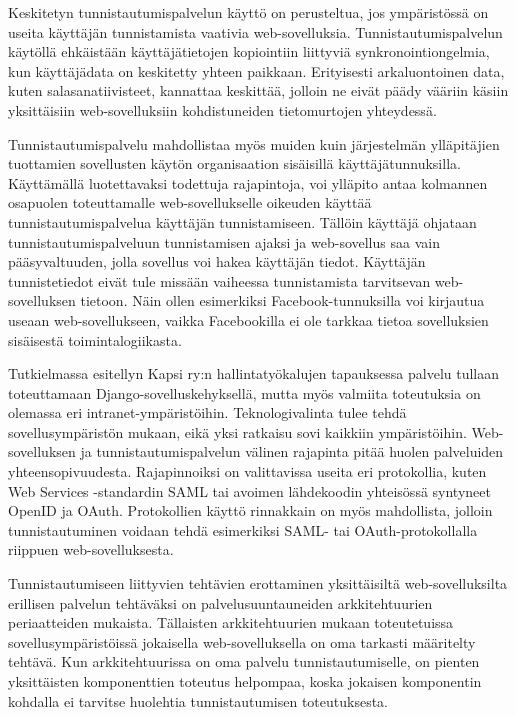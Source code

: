 Keskitetyn tunnistautumispalvelun käyttö on perusteltua, jos ympäristössä on useita käyttäjän tunnistamista vaativia web-sovelluksia. Tunnistautumispalvelun käytöllä ehkäistään käyttäjätietojen kopiointiin liittyviä synkronointiongelmia, kun käyttäjädata on keskitetty yhteen paikkaan. Erityisesti arkaluontoinen data, kuten salasanatiivisteet, kannattaa keskittää, jolloin ne eivät päädy vääriin käsiin yksittäisiin web-sovelluksiin kohdistuneiden tietomurtojen yhteydessä.

Tunnistautumispalvelu mahdollistaa myös muiden kuin järjestelmän ylläpitäjien tuottamien sovellusten käytön organisaation sisäisillä käyttäjätunnuksilla. Käyttämällä luotettavaksi todettuja rajapintoja, voi ylläpito antaa kolmannen osapuolen toteuttamalle web-sovellukselle oikeuden käyttää tunnistautumispalvelua käyttäjän tunnistamiseen. Tällöin käyttäjä ohjataan tunnistautumispalveluun tunnistamisen ajaksi ja web-sovellus saa vain pääsyvaltuuden, jolla sovellus voi hakea käyttäjän tiedot. Käyttäjän tunnistetiedot eivät tule missään vaiheessa tunnistamista tarvitsevan web-sovelluksen tietoon. Näin ollen esimerkiksi Facebook-tunnuksilla voi kirjautua useaan web-sovellukseen, vaikka Facebookilla ei ole tarkkaa tietoa sovelluksien sisäisestä toimintalogiikasta.

Tutkielmassa esitellyn Kapsi ry:n hallintatyökalujen tapauksessa palvelu tullaan toteuttamaan Django-sovelluskehyksellä, mutta myös valmiita toteutuksia on olemassa eri intranet-ympäristöihin. Teknologivalinta tulee tehdä sovellusympäristön mukaan, eikä yksi ratkaisu sovi kaikkiin ympäristöihin. Web-sovelluksen ja tunnistautumispalvelun välinen rajapinta pitää huolen palveluiden yhteensopivuudesta. Rajapinnoiksi on valittavissa useita eri protokollia, kuten Web Services -standardin SAML tai avoimen lähdekoodin yhteisössä syntyneet OpenID ja OAuth. Protokollien käyttö rinnakkain on myös mahdollista, jolloin tunnistautuminen voidaan tehdä esimerkiksi SAML- tai OAuth-protokollalla riippuen web-sovelluksesta.

Tunnistautumiseen liittyvien tehtävien erottaminen yksittäisiltä web-sovelluksilta erillisen palvelun tehtäväksi on palvelusuuntauneiden arkkitehtuurien periaatteiden mukaista. Tällaisten arkkitehtuurien mukaan toteutetuissa sovellusympäristöissä jokaisella web-sovelluksella on oma tarkasti määritelty tehtävä. Kun arkkitehtuurissa on oma palvelu tunnistautumiselle, on pienten yksittäisten komponenttien toteutus helpompaa, koska jokaisen komponentin kohdalla ei tarvitse huolehtia tunnistautumisen toteutuksesta.

